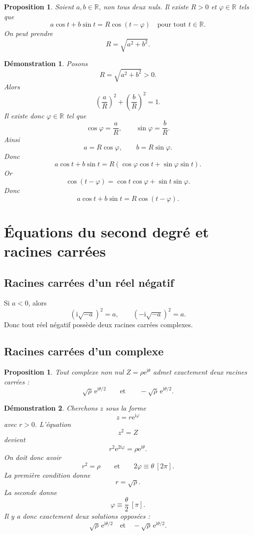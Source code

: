 \documentclass[11pt,a4paper]{article}
\newtheorem{proposition}[definition]{Proposition}
\newtheorem*{demonstration}{Démonstration}
\newcommand{\R}{\mathbb{R}}
\newcommand{\ii}{\mathrm{i}}
\newcommand{\e}{\mathrm{e}}
\begin{document}
\begin{proposition}
Soient $a,b\in \R$, non tous deux nuls. Il existe $R>0$ et $\varphi\in \R$ tels que
\[
a\cos t+b\sin t=R\cos(t-\varphi)
\quad \text{pour tout } t\in \R.
\]
On peut prendre
\[
R=\sqrt{a^2+b^2}.
\]
\end{proposition}

\begin{demonstration}
Posons
\[
R=\sqrt{a^2+b^2}>0.
\]
Alors
\[
\left(\frac{a}{R}\right)^2+\left(\frac{b}{R}\right)^2=1.
\]
Il existe donc $\varphi\in \R$ tel que
\[
\cos\varphi=\frac{a}{R},
\qquad
\sin\varphi=\frac{b}{R}.
\]
Ainsi
\[
a=R\cos\varphi,\qquad b=R\sin\varphi.
\]
Donc
\[
a\cos t+b\sin t
=R(\cos\varphi\cos t+\sin\varphi\sin t).
\]
Or
\[
\cos(t-\varphi)=\cos t\cos\varphi+\sin t\sin\varphi.
\]
Donc
\[
a\cos t+b\sin t=R\cos(t-\varphi).
\]
\end{demonstration}

\section{Équations du second degré et racines carrées}

\subsection{Racines carrées d'un réel négatif}

Si $a<0$, alors
\[
(\ii\sqrt{-a})^2=a,
\qquad
(-\ii\sqrt{-a})^2=a.
\]
Donc tout réel négatif possède deux racines carrées complexes.

\subsection{Racines carrées d'un complexe}

\begin{proposition}
Tout complexe non nul $Z=\rho \e^{\ii\theta}$ admet exactement deux racines carrées :
\[
\sqrt{\rho}\,\e^{\ii\theta/2}
\qquad \text{et} \qquad
-\sqrt{\rho}\,\e^{\ii\theta/2}.
\]
\end{proposition}

\begin{demonstration}
Cherchons $z$ sous la forme
\[
z=r\e^{\ii\varphi}
\]
avec $r>0$.
L'équation
\[
z^2=Z
\]
devient
\[
r^2\e^{2\ii\varphi}=\rho \e^{\ii\theta}.
\]
On doit donc avoir
\[
r^2=\rho
\qquad \text{et} \qquad
2\varphi\equiv \theta \ [2\pi].
\]
La première condition donne
\[
r=\sqrt{\rho}.
\]
La seconde donne
\[
\varphi\equiv \frac{\theta}{2} \ [\pi].
\]
Il y a donc exactement deux solutions opposées :
\[
\sqrt{\rho}\,\e^{\ii\theta/2}
\quad \text{et} \quad
-\sqrt{\rho}\,\e^{\ii\theta/2}.
\]
\end{demonstration}
\end{document}
